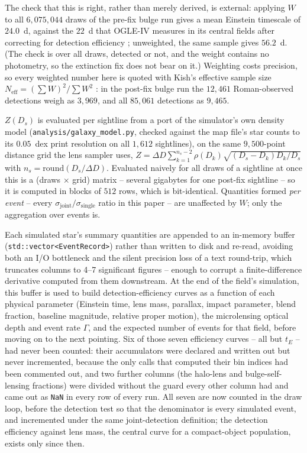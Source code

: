 \documentclass[english,10pt,a4paper]{article}
\begin{document}
	The check that this is right, rather than merely derived, is external: applying $W$ to all $6{,}075{,}044$ draws of the pre-fix bulge run gives a mean Einstein timescale of $24.0$~d, against the $22$~d that OGLE-IV measures in its central fields after correcting for detection efficiency \cite{Mroz2019OGLEIV}; unweighted, the same sample gives $56.2$~d. (The check is over all draws, detected or not, and the weight contains no photometry, so the extinction fix does not bear on it.) Weighting costs precision, so every weighted number here is quoted with Kish's effective sample size $N_{\mathrm{eff}}=(\sum W)^2/\sum W^2$ \cite{Kish1965}: in the post-fix bulge run the $12{,}461$ Roman-observed detections weigh as $3{,}969$, and all $85{,}061$ detections as $9{,}465$.

	$Z(D_s)$ is evaluated per sightline from a port of the simulator's own density model (\texttt{analysis/galaxy\_model.py}, checked against the map file's star counts to its $0.05$~dex print resolution on all $1{,}612$ sightlines), on the same $9{,}500$-point distance grid the lens sampler uses, $Z = \Delta D\sum_{k=1}^{n_s-2}\rho(D_k)\sqrt{(D_s-D_k)D_k/D_s}$ with $n_s = \mathrm{round}(D_s/\Delta D)$. Evaluated naively for all draws of a sightline at once this is a (draws $\times$ grid) matrix -- several gigabytes for one post-fix sightline -- so it is computed in blocks of $512$ rows, which is bit-identical. Quantities formed \emph{per event} -- every $\sigma_{\mathrm{joint}}/\sigma_{\mathrm{single}}$ ratio in this paper -- are unaffected by $W$; only the aggregation over events is.

	Each simulated star's summary quantities are appended to an in-memory buffer (\texttt{std::vector<EventRecord>}) rather than written to disk and re-read, avoiding both an I/O bottleneck and the silent precision loss of a text round-trip, which truncates columns to 4--7 significant figures -- enough to corrupt a finite-difference derivative computed from them downstream. At the end of the field's simulation, this buffer is used to build detection-efficiency curves as a function of each physical parameter (Einstein time, lens mass, parallax, impact parameter, blend fraction, baseline magnitude, relative proper motion), the microlensing optical depth and event rate $\Gamma$, and the expected number of events for that field, before moving on to the next pointing. Six of those seven efficiency curves -- all but $t_E$ -- had never been counted: their accumulators were declared and written out but never incremented, because the only calls that computed their bin indices had been commented out, and two further columns (the halo-lens and bulge-self-lensing fractions) were divided without the guard every other column had and came out as \texttt{NaN} in every row of every run. All seven are now counted in the draw loop, before the detection test so that the denominator is every simulated event, and incremented under the same joint-detection definition; the detection efficiency against lens mass, the central curve for a compact-object population, exists only since then.
	
\end{document}
